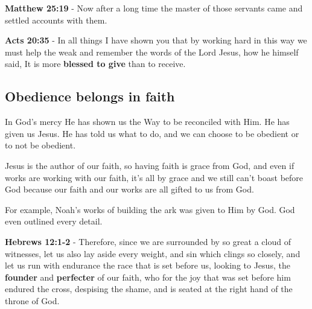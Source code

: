 \documentclass[11pt]{article}
\begin{document}
\textbf{Matthew 25:19} - Now after a long time the master of those servants came and settled accounts with them.

\textbf{Acts 20:35} - In all things I have shown you that by working hard in this way we must help the weak and remember the words of the Lord Jesus, how he himself said, It is more \textbf{blessed to give} than to receive.

\subsection{Obedience belongs in faith}
\label{sec:orgd7c0528}
In God's mercy He has shown us the Way to be reconciled with Him. He has given us Jesus. He has told us what to do, and we can choose to be obedient or to not be obedient.

Jesus is the author of our faith, so having faith is grace from God, and even if works are working with our faith, it's all by grace and we still can't boast before God because our faith and our works are all gifted to us from God.

For example, Noah's works of building the ark was given to Him by God. God even outlined every detail.

\textbf{Hebrews 12:1-2} - Therefore, since we are surrounded by so great a cloud of witnesses, let us also lay aside every weight, and sin which clings so closely, and let us run with endurance the race that is set before us, looking to Jesus, the \textbf{founder} and \textbf{perfecter} of our faith, who for the joy that was set before him endured the cross, despising the shame, and is seated at the right hand of the throne of God.
\end{document}
